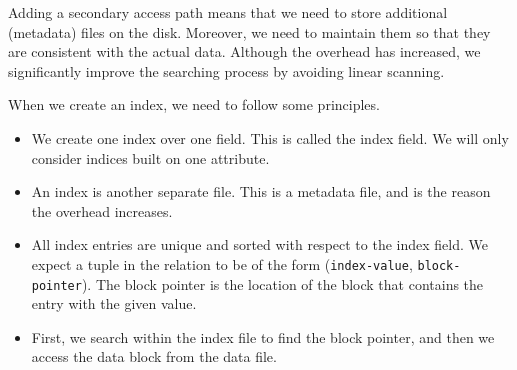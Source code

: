 \documentclass[a4paper, openany]{memoir}
\begin{document}
Adding a secondary access path means that we need to store additional (metadata) files on the disk. Moreover, we need to maintain them so that they are consistent with the actual data. Although the overhead has increased, we significantly improve the searching process by avoiding linear scanning.

            
            

When we create an index, we need to follow some principles.
\begin{itemize}
    \item We create one index over one field. This is called the index field. We will only consider indices built on one attribute.
    \item An index is another separate file. This is a metadata file, and is the reason the overhead increases.
    \item All index entries are unique and sorted with respect to the index field. We expect a tuple in the relation to be of the form (\texttt{index-value}, \texttt{block-pointer}).
    The block pointer is the location of the block that contains the entry with the given value.
    \item First, we search within the index file to find the block pointer, and then we access the data block from the data file.
\end{itemize}
\end{document}
